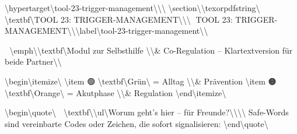 \textbackslash{}hypertarget\textbackslash{}{tool-23-trigger-management\textbackslash{}}\textbackslash{}{\textbackslash{}%
\textbackslash{}section\textbackslash{}{\textbackslash{}texorpdfstring\textbackslash{}{📄 \textbackslash{}textbf\textbackslash{}{TOOL 23: TRIGGER-MANAGEMENT\textbackslash{}}\textbackslash{}}\textbackslash{}{📄 TOOL 23: TRIGGER-MANAGEMENT\textbackslash{}}\textbackslash{}}\textbackslash{}label\textbackslash{}{tool-23-trigger-management\textbackslash{}}\textbackslash{}}

🧩 \textbackslash{}emph\textbackslash{}{\textbackslash{}textbf\textbackslash{}{Modul zur Selbsthilfe \textbackslash{}\textbackslash{}\& Co-Regulation -- Klartextversion für beide Partner\textbackslash{}}\textbackslash{}}

\textbackslash{}begin\textbackslash{}{itemize\textbackslash{}}
\textbackslash{}item
  🟢 \textbackslash{}textbf\textbackslash{}{Grün\textbackslash{}} = Alltag \textbackslash{}\textbackslash{}\& Prävention
\textbackslash{}item
  🟠 \textbackslash{}textbf\textbackslash{}{Orange\textbackslash{}} = Akutphase \textbackslash{}\textbackslash{}\& Regulation
\textbackslash{}end\textbackslash{}{itemize\textbackslash{}}

\textbackslash{}begin\textbackslash{}{quote\textbackslash{}}
🧠 \textbackslash{}textbf\textbackslash{}{\textbackslash{}ul\textbackslash{}{Worum geht's hier -- für Freunde?\textbackslash{}}\textbackslash{}}\textbackslash{}\textbackslash{}
Safe-Words sind vereinbarte Codes oder Zeichen, die sofort signalisieren:
\textbackslash{}end\textbackslash{}{quote\textbackslash{}}